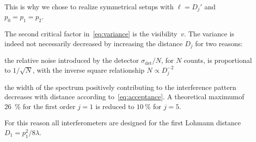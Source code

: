 This is why we chose to realize symmetrical setups with $\ell = D_j'$ and $p_0 = p_1 = p_2$.

The second critical factor in~\eqref{eq:variance} is the visibility~$v$. The
variance is indeed not necessarily decreased by increasing the distance
$D_j$ for two reasons:
\begin{aenumerate}
    \item the relative noise introduced by the detector
        $\sigma_{\text{det}}/N$, for
        $N$ counts, is proportional to $1 / \sqrt{N}$, with the inverse
        square relationship $N \propto
        D_j^{-2}$
    \item the width of the spectrum positively contributing to the
        interference pattern decreases with distance according
        to~\eqref{eq:acceptance}. A theoretical maximum\cn of
        \SI{26}{\percent} for the first order $j = 1$ is reduced to
        $\SI{10}{\percent}$ for $j = 5$.
\end{aenumerate}
For this reason all interferometers are designed for the first Lohmann
distance $D_1 = p_1^2 / 8 \lambda$.

